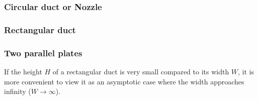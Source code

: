 \subsubsection*{Circular duct or Nozzle}



\subsubsection*{Rectangular duct}



\subsubsection*{Two parallel plates}

If the height $H$ of a rectangular duct is very small compared to its width $W$, it is more convenient to view it as an asymptotic case where the width approaches infinity ($W \to \infty$).



